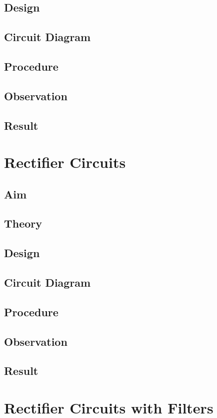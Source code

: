 \documentclass{book}
\begin{document}
\section*{Design}
\section*{Circuit Diagram}
\section*{Procedure}
\section*{Observation}
\section*{Result}
\chapter[Rectifier Circuits]{Rectifier Circuits}
\section*{Aim}
\section*{Theory}
\section*{Design}
\section*{Circuit Diagram}
\section*{Procedure}
\section*{Observation}
\section*{Result}
\chapter[Rectifier Circuits with Filters]{Rectifier Circuits with Filters}
\end{document}
